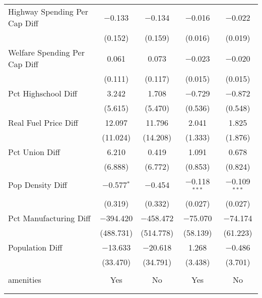 \begin{table}[!htbp]
\begin{tabular}{@{\extracolsep{5pt}}lcccc}
  Highway Spending Per Cap Diff & $-$0.133 & $-$0.134 & $-$0.016 & $-$0.022 \\ 
  & (0.152) & (0.159) & (0.016) & (0.019) \\ 
  Welfare Spending Per Cap Diff & 0.061 & 0.073 & $-$0.023 & $-$0.020 \\ 
  & (0.111) & (0.117) & (0.015) & (0.015) \\ 
  Pct Highschool Diff & 3.242 & 1.708 & $-$0.729 & $-$0.872 \\ 
  & (5.615) & (5.470) & (0.536) & (0.548) \\ 
  Real Fuel Price Diff & 12.097 & 11.796 & 2.041 & 1.825 \\ 
  & (11.024) & (14.208) & (1.333) & (1.876) \\ 
  Pct Union Diff & 6.210 & 0.419 & 1.091 & 0.678 \\ 
  & (6.888) & (6.772) & (0.853) & (0.824) \\ 
  Pop Density Diff & $-$0.577$^{*}$ & $-$0.454 & $-$0.118$^{***}$ & $-$0.109$^{***}$ \\ 
  & (0.319) & (0.332) & (0.027) & (0.027) \\ 
  Pct Manufacturing Diff & $-$394.420 & $-$458.472 & $-$75.070 & $-$74.174 \\ 
  & (488.731) & (514.778) & (58.139) & (61.223) \\ 
  Population Diff & $-$13.633 & $-$20.618 & 1.268 & $-$0.486 \\ 
  & (33.470) & (34.791) & (3.438) & (3.701) \\ 
 \hline \\[-1.8ex] 
amenities & Yes & No & Yes & No \\ 
\hline \\[-1.8ex] 
\hline 
\hline \\[-1.8ex] 
\end{tabular} 
\end{table} 
